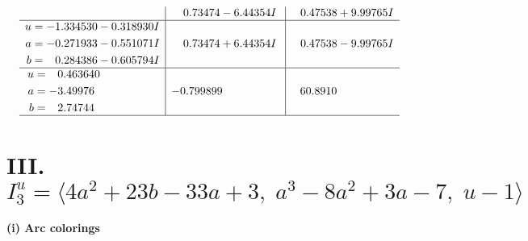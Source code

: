 \documentclass[1p]{elsarticle_modified}
\theoremstyle{definition}
\begin{document}
$$\begin{array}{c|c|c}
 & \phantom{-}0.73474 - 6.44354 I & \phantom{-}0.47538 + 9.99765 I \\ \hline\begin{aligned}
u &= -1.334530 - 0.318930 I \\
a &= -0.271933 - 0.551071 I \\
b &= \phantom{-}0.284386 - 0.605794 I\end{aligned}
 & \phantom{-}0.73474 + 6.44354 I & \phantom{-}0.47538 - 9.99765 I \\ \hline\begin{aligned}
u &= \phantom{-}0.463640\phantom{ +0.000000I} \\
a &= -3.49976\phantom{ +0.000000I} \\
b &= \phantom{-}2.74744\phantom{ +0.000000I}\end{aligned}
 & -0.799899\phantom{ +0.000000I} & \phantom{-}60.8910\phantom{ +0.000000I}\\
 \hline 
 \end{array}$$\newpage\newpage\renewcommand{\arraystretch}{1}
\centering \section*{III. $I^u_{3}= \langle 4 a^2+23 b-33 a+3,\;a^3-8 a^2+3 a-7,\;u-1 \rangle$}
\flushleft \textbf{(i) Arc colorings}\\
\end{document}

